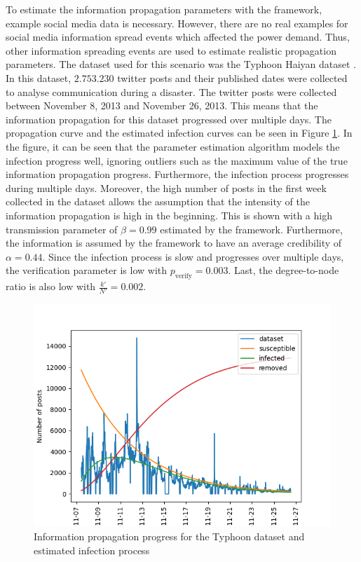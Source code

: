 To estimate the information propagation parameters with the framework,
example social media data is necessary. However, there are no real examples
for social media information spread events which affected the power demand.
Thus, other information spreading events are used to estimate 
realistic propagation parameters. The dataset used for this scenario
was the Typhoon Haiyan dataset \cite{david2016tweeting}. In this
dataset, $2.753.230$ twitter posts and their published dates were collected
to analyse communication during a disaster. The twitter posts were collected
between November 8, 2013 and November 26, 2013. This means that the 
information propagation for this dataset progressed over multiple days.
The propagation curve and the estimated infection curves can be seen in 
Figure \ref{propagationestimationtyphoon}. In the figure, it can be seen 
that the parameter estimation algorithm models the infection progress
well, ignoring outliers such as the maximum value of the true information
propagation progress. Furthermore, 
the infection process progresses during multiple days. Moreover, the high number 
of posts in the first week collected in the dataset
allows the assumption that the intensity of the information propagation
is high in the beginning. This is shown with a high transmission parameter 
of $\beta=0.99$ estimated by the framework. Furthermore, the
information is assumed by the framework to have an average credibility 
of $\alpha=0.44$. Since the infection process is slow and progresses over 
multiple days, the verification parameter is
low with $p_{\mathrm{verify}}=0.003$. Last, the degree-to-node ratio
is also low with $\frac{k'}{N'}=0.002$.


\begin{figure}[!ht]
    \center
    \includegraphics[scale=.95]{figs/parameter_estimation.png}
    \caption{Information propagation progress for the Typhoon dataset 
    and estimated infection process}
    \label{propagationestimationtyphoon}
\end{figure}

